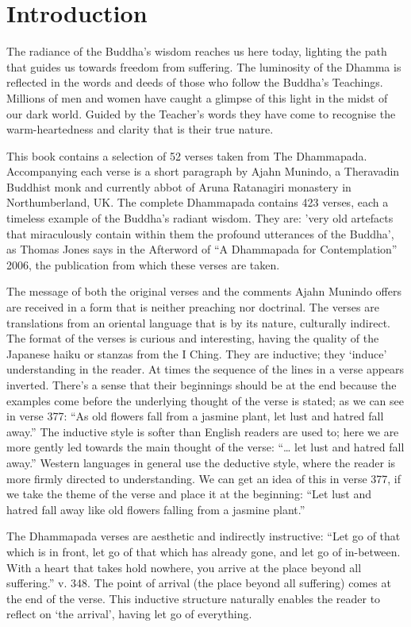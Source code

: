 
\chapter{Introduction}

The radiance of the Buddha's wisdom reaches us here today, lighting the
path that guides us towards freedom from suffering. The luminosity of
the Dhamma is reflected in the words and deeds of those who follow the
Buddha's Teachings. Millions of men and women have caught a glimpse of
this light in the midst of our dark world. Guided by the Teacher's words
they have come to recognise the warm-heartedness and clarity that is
their true nature.

This book contains a selection of 52 verses taken from The Dhammapada.
Accompanying each verse is a short paragraph by Ajahn Munindo, a
Theravadin Buddhist monk and currently abbot of Aruna Ratanagiri
monastery in Northumberland, UK. The complete Dhammapada contains 423
verses, each a timeless example of the Buddha's radiant wisdom. They
are: 'very old artefacts that miraculously contain within them the
profound utterances of the Buddha', as Thomas Jones says in the
Afterword of ``A Dhammapada for Contemplation'' 2006, the publication
from which these verses are taken.

The message of both the original verses and the comments Ajahn Munindo
offers are received in a form that is neither preaching nor doctrinal.
The verses are translations from an oriental language that is by its
nature, culturally indirect. The format of the verses is curious and
interesting, having the quality of the Japanese haiku or stanzas from
the I Ching. They are inductive; they `induce' understanding in the
reader. At times the sequence of the lines in a verse appears inverted.
There's a sense that their beginnings should be at the end because the
examples come before the underlying thought of the verse is stated; as
we can see in verse 377: ``As old flowers fall from a jasmine plant, let
lust and hatred fall away.'' The inductive style is softer than English
readers are used to; here we are more gently led towards the main
thought of the verse: ``\ldots{} let lust and hatred fall away.'' Western
languages in general use the deductive style, where the reader is more
firmly directed to understanding. We can get an idea of this in verse
377, if we take the theme of the verse and place it at the beginning:
``Let lust and hatred fall away like old flowers falling from a jasmine
plant.''


The Dhammapada verses are aesthetic and indirectly instructive: ``Let go
of that which is in front, let go of that which has already gone, and
let go of in-between. With a heart that takes hold nowhere, you arrive
at the place beyond all suffering.'' v. 348. The point of arrival (the
place beyond all suffering) comes at the end of the verse. This
inductive structure naturally enables the reader to reflect on `the
arrival', having let go of everything.

